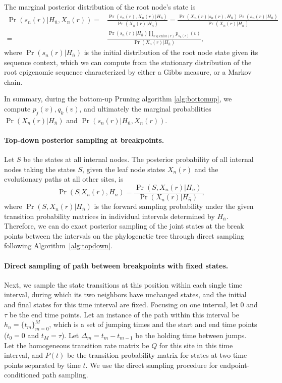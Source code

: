 \documentclass[11pt]{article}
\newcommand{\child}[1]{\ensuremath{\mathrm{child}(#1)}}
\begin{document}
The marginal posterior distribution of the root node's state is
\begin{equation} \label{eqn:rootposterior}
  \begin{aligned}
    \Pr(s_n(r)| H_{\overline{n}}, X_n(r)) = &
    \frac{\Pr(s_n(r), X_n(r) | H_{\overline{n}})}{\Pr(X_n(r) | H_{\overline{n}})} =
    \frac{\Pr(X_n(r) |s_n(r), H_{\overline{n}}) \Pr(s_n(r) | H_{\overline{n}})}{\Pr(X_n(r)| H_{\overline{n}}) }  \\
= & \frac{\Pr(s_n(r)|H_{\overline{n}}) \prod_{v\in \child{r}} p_{s_n(r)}(v)}{\Pr(X_n(r)| H_{\overline{n}}) },
\end{aligned}
\end{equation}
where $\Pr(s_n(r)|H_{\overline{n}})$ is the initial distribution of the root node
state given its sequence context, which we can compute from the
stationary distribution of the root epigenomic sequence characterized
by either a Gibbs measure, or a Markov chain.

In summary, during the bottom-up Pruning algorithm \ref{alg:bottomup},
we compute $p_j(v), q_k(v)$, and ultimately the marginal probabilities
$\Pr(X_n(r) | H_{\overline{n}})$ and $\Pr(s_n(r)|H_{\overline{n}},
X_n(r))$.

\paragraph{Top-down posterior sampling at breakpoints.}
Let $S$ be the states at all internal nodes. The posterior probability
of all internal nodes taking the states $S$, given the leaf node
states $X_n(r)$ and the evolutionary paths at all other sites, is
\[
\Pr(S | X_n(r), H_{\overline{n}}) = \frac{\Pr(S, X_n(r) | H_{\overline{n}}) }{\Pr(X_n(r) | H_{\overline{n}})},
\]
where $\Pr(S, X_n(r) | H_{\overline{n}}) $ is the forward sampling probability
under the given transition probability matrices in individual
intervals determined by $H_{\overline{n}}$.
Therefore, we can do exact posterior sampling of the joint states at
the break points between the intervals on the phylogenetic tree through
direct sampling following Algorithm~\ref{alg:topdown}.

\paragraph{Direct sampling of path between breakpoints with fixed states.}
Next, we sample the state transitions at this position within each
single time interval, during which its two neighbors have unchanged
states, and the initial and final states for this time interval are
fixed.  Focusing on one interval, let $0$ and $\tau$ be the end time
points.  Let an instance of the path within this interval be $h_n=
\{t_m\}_{m=0}^{M}$, which is a set of jumping times and the start and
end time points ($t_0 = 0$ and $t_M=\tau$). Let $\Delta_m = t_m -
t_{m-1}$ be the holding time between jumps. Let the homogeneous
transition rate matrix be $Q$ for this site in this time interval, and
$P(t)$ be the transition probability matrix for states at two time
points separated by time $t$. We use the direct sampling procedure
\cite{hobolth2009simulation} for endpoint-conditioned path sampling.
\end{document}

